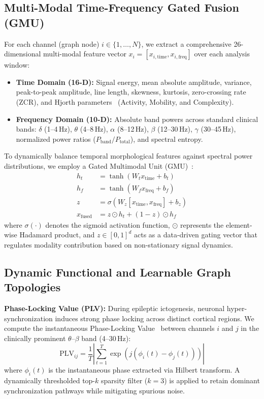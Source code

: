 \documentclass[journal]{IEEEtran}
\begin{document}
\subsection{Multi-Modal Time-Frequency Gated Fusion (GMU)}
For each channel (graph node) $i \in \{1, \dots, N\}$, we extract a comprehensive 26-dimensional multi-modal feature vector $x_i = [x_{i,\text{time}}, x_{i,\text{freq}}]$ over each analysis window:
\begin{itemize}
    \item \textbf{Time Domain (16-D):} Signal energy, mean absolute amplitude, variance, peak-to-peak amplitude, line length, skewness, kurtosis, zero-crossing rate (ZCR), and Hjorth parameters~\cite{hjorth1970eeg} (Activity, Mobility, and Complexity).
    \item \textbf{Frequency Domain (10-D):} Absolute band powers across standard clinical bands: $\delta$ (1--4\,Hz), $\theta$ (4--8\,Hz), $\alpha$ (8--12\,Hz), $\beta$ (12--30\,Hz), $\gamma$ (30--45\,Hz), normalized power ratios ($P_{\text{band}} / P_{\text{total}}$), and spectral entropy.
\end{itemize}

To dynamically balance temporal morphological features against spectral power distributions, we employ a Gated Multimodal Unit (GMU)~\cite{arevalo2017gated}:
\begin{align}
h_t &= \tanh(W_t x_{\text{time}} + b_t) \\
h_f &= \tanh(W_f x_{\text{freq}} + b_f) \\
z &= \sigma(W_z [x_{\text{time}}, x_{\text{freq}}] + b_z) \\
x_{\text{fused}} &= z \odot h_t + (1 - z) \odot h_f
\end{align}
where $\sigma(\cdot)$ denotes the sigmoid activation function, $\odot$ represents the element-wise Hadamard product, and $z \in [0, 1]^d$ acts as a data-driven gating vector that regulates modality contribution based on non-stationary signal dynamics.

\subsection{Dynamic Functional and Learnable Graph Topologies}
\textbf{Phase-Locking Value (PLV):} During epileptic ictogenesis, neuronal hyper-synchronization induces strong phase locking across distinct cortical regions. We compute the instantaneous Phase-Locking Value~\cite{lachaux1999measuring} between channels $i$ and $j$ in the clinically prominent $\theta$--$\beta$ band (4--30\,Hz):
\begin{equation}
\text{PLV}_{ij} = \frac{1}{T} \left| \sum_{t=1}^T \exp\left(j\left(\phi_i(t) - \phi_j(t)\right)\right) \right|
\end{equation}
where $\phi_i(t)$ is the instantaneous phase extracted via Hilbert transform. A dynamically thresholded top-$k$ sparsity filter ($k=3$) is applied to retain dominant synchronization pathways while mitigating spurious noise.
\end{document}
